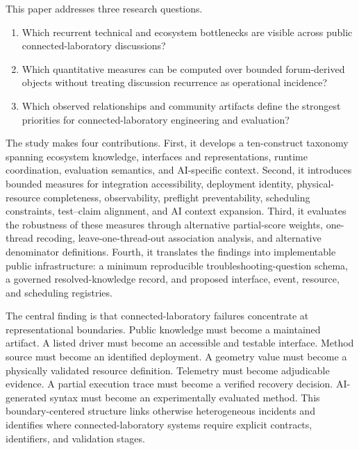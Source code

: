 This paper addresses three research questions.
\begin{enumerate}[label=\textbf{RQ\arabic*.}]
  \item Which recurrent technical and ecosystem bottlenecks are visible across public connected-laboratory discussions?
  \item Which quantitative measures can be computed over bounded forum-derived objects without treating discussion recurrence as operational incidence?
  \item Which observed relationships and community artifacts define the strongest priorities for connected-laboratory engineering and evaluation?
\end{enumerate}

The study makes four contributions. First, it develops a ten-construct taxonomy spanning ecosystem knowledge, interfaces and representations, runtime coordination, evaluation semantics, and AI-specific context. Second, it introduces bounded measures for integration accessibility, deployment identity, physical-resource completeness, observability, preflight preventability, scheduling constraints, test--claim alignment, and AI context expansion. Third, it evaluates the robustness of these measures through alternative partial-score weights, one-thread recoding, leave-one-thread-out association analysis, and alternative denominator definitions. Fourth, it translates the findings into implementable public infrastructure: a minimum reproducible troubleshooting-question schema, a governed resolved-knowledge record, and proposed interface, event, resource, and scheduling registries.

The central finding is that connected-laboratory failures concentrate at representational boundaries. Public knowledge must become a maintained artifact. A listed driver must become an accessible and testable interface. Method source must become an identified deployment. A geometry value must become a physically validated resource definition. Telemetry must become adjudicable evidence. A partial execution trace must become a verified recovery decision. AI-generated syntax must become an experimentally evaluated method. This boundary-centered structure links otherwise heterogeneous incidents and identifies where connected-laboratory systems require explicit contracts, identifiers, and validation stages.
